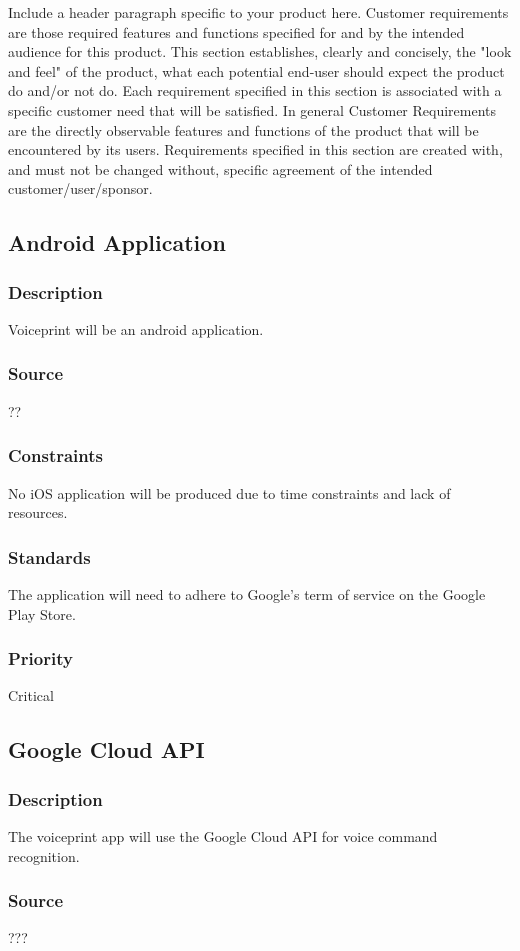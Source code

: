 Include a header paragraph specific to your product here. Customer requirements are those required features and functions specified for and by the intended audience for this product. This section establishes, clearly and concisely, the "look and feel" of the product, what each potential end-user should expect the product do and/or not do. Each requirement specified in this section is associated with a specific customer need that will be satisfied. In general Customer Requirements are the directly observable features and functions of the product that will be encountered by its users. Requirements specified in this section are created with, and must not be changed without, specific agreement of the intended customer/user/sponsor.

\subsection{Android Application}
\subsubsection{Description}
Voiceprint will be an android application.
\subsubsection{Source}
??
\subsubsection{Constraints}
No iOS application will be produced due to time constraints and lack of resources.
\subsubsection{Standards}
The application will need to adhere to Google's term of service on the Google Play Store.
\subsubsection{Priority}
Critical
\subsection{Google Cloud API}
\subsubsection{Description}
The voiceprint app will use the Google Cloud API for voice command recognition.
\subsubsection{Source}
???
